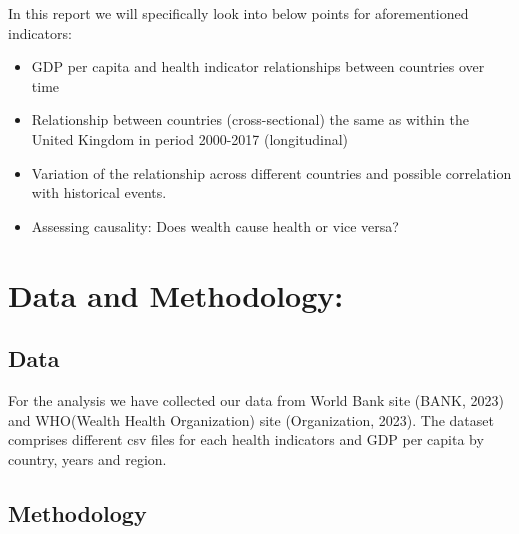 \documentclass[
]{article}
\providecommand{\tightlist}{%
  \setlength{\itemsep}{0pt}\setlength{\parskip}{0pt}}
\begin{document}
In this report we will specifically look into below points for
aforementioned indicators:

\begin{itemize}
\tightlist
\item
  GDP per capita and health indicator relationships between countries
  over time
\item
  Relationship between countries (cross-sectional) the same as within
  the United Kingdom in period 2000-2017 (longitudinal)
\item
  Variation of the relationship across different countries and possible
  correlation with historical events.
\item
  Assessing causality: Does wealth cause health or vice versa?
\end{itemize}

\hypertarget{data-and-methodology}{%
\section{Data and Methodology:}\label{data-and-methodology}}

\hypertarget{data}{%
\subsection{Data}\label{data}}

For the analysis we have collected our data from World Bank site (BANK,
2023) and WHO(Wealth Health Organization) site (Organization, 2023). The
dataset comprises different csv files for each health indicators and GDP
per capita by country, years and region.

\hypertarget{methodology}{%
\subsection{Methodology}\label{methodology}}
\end{document}
